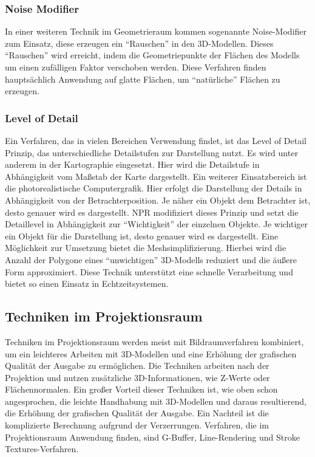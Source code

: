\subsubsection{Noise Modifier}
In einer weiteren Technik im Geometrieraum kommen sogenannte Noise-Modifier zum 
Einsatz, diese erzeugen ein "`Rauschen"' in den 3D-Modellen. Dieses "`Rauschen"' 
wird erreicht, indem die Geometriepunkte der Flächen des Modells um einen 
zufälligen Faktor verschoben werden. Diese Verfahren finden hauptsächlich 
Anwendung auf glatte Flächen, um "`natürliche"' Flächen zu erzeugen.

\subsubsection{Level of Detail}
Ein Verfahren, das in vielen Bereichen Verwendung findet, ist das Level of 
Detail Prinzip, das unterschiedliche Detailstufen zur Darstellung nutzt. Es 
wird unter anderem in der Kartographie eingesetzt. Hier wird die Detailstufe in 
Abhängigkeit vom Maßstab der Karte dargestellt. Ein weiterer Einsatzbereich ist 
die photorealistische Computergrafik. Hier erfolgt die Darstellung der Details 
in Abhängigkeit von der Betrachterposition. Je näher ein Objekt dem Betrachter 
ist, desto genauer wird es dargestellt. NPR modifiziert dieses Prinzip und 
setzt die Detaillevel in Abhängigkeit zur "`Wichtigkeit"' der einzelnen Objekte. 
Je wichtiger ein Objekt für die Darstellung ist, desto genauer wird es 
dargestellt. Eine Möglichkeit zur Umsetzung bietet die Meshsimplifizierung. 
Hierbei wird die Anzahl der Polygone eines "`unwichtigen"' 3D-Modells reduziert 
und die äußere Form approximiert. Diese Technik unterstützt eine schnelle 
Verarbeitung und bietet so einen Einsatz in Echtzeitsystemen.

\subsection{Techniken im Projektionsraum}
Techniken im Projektionsraum werden meist mit Bildraumverfahren kombiniert, um 
ein leichteres Arbeiten mit 3D-Modellen und eine Erhöhung der grafischen 
Qualität der Ausgabe zu ermöglichen. Die Techniken arbeiten nach der Projektion 
und nutzen zusätzliche 3D-Informationen, wie Z-Werte oder Flächennormalen. 
Ein großer Vorteil dieser Techniken ist, wie oben schon angesprochen, die 
leichte Handhabung mit 3D-Modellen und daraus resultierend, die Erhöhung der
grafischen Qualität der Ausgabe. Ein Nachteil ist die komplizierte Berechnung
aufgrund der Verzerrungen. Verfahren, die im Projektionsraum Anwendung finden,
sind G-Buffer, Line-Rendering und Stroke Textures-Verfahren.


